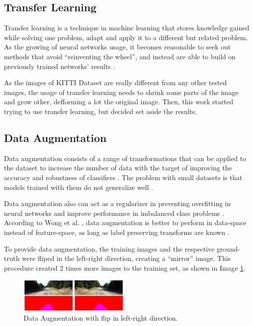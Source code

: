 \documentclass[10pt,twocolumn,letterpaper]{article}
\begin{document}
\subsection{Transfer Learning} \label{ssec:transfer_learning}

Transfer learning is a technique in machine learning that stores knowledge gained while solving one problem, adapt and apply it to a different but related problem. As the growing of neural networks usage, it becomes reasonable to seek out methods that avoid ``reinventing the wheel'', and instead are able to build on previously trained networks' results \cite{PRATT} \cite{WEISS2016}.

As the images of KITTI Dataset are really different from any other tested images, the usage of transfer learning needs to shrink some parts of the image and grow other, defforming a lot the original image. Then, this work started trying to use transfer learning, but decided set aside the results.

\subsection{Data Augmentation} \label{ssec:data_augmentation}

Data augmentation consists of a range of transformations that can be applied to the dataset to increase the number of data with the target of improving the accuracy and robustness of classifiers \cite{AUGM_ADAPT}. The problem with small datasets is that models trained with them do not generalize well \cite{AUGM_DEEP}.

Data augmentation also can act as a regularizer in preventing overfitting in neural networks and improve performance in imbalanced class problems \cite{DATA_AUGM}. According to Wong et al. \cite{DATA_AUGM}, data augmentation is better to perform in data-space instead of feature-space, as long as label preserving transforms are known \cite{DATA_AUGM}.

To provide data augmentation, the training images and the respective ground-truth were fliped in the left-right direction, creating a ``mirror'' image. This procedure created 2 times more images to the training set, as shown in Image \ref{fig:data_augmentation}. 

\begin{figure}[ht]
  \centering
  \includegraphics[width=0.48\textwidth]{data_augmentation.png}
  \caption{Data Augmentation with flip in left-right direction.}
  \label{fig:data_augmentation}
\end{figure}
\end{document}
